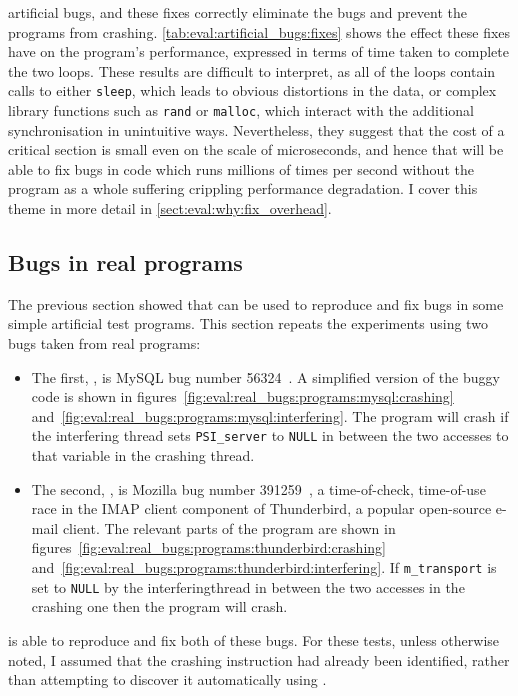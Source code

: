artificial bugs, and these fixes correctly eliminate the bugs and
prevent the programs from crashing.
\autoref{tab:eval:artificial_bugs:fixes} shows the effect these fixes
have on the program's performance, expressed in terms of time taken to
complete the two loops.  These results are difficult to interpret, as
all of the loops contain calls to either \texttt{sleep}, which leads
to obvious distortions in the data, or complex library functions such
as \texttt{rand} or \texttt{malloc}, which interact with the
additional synchronisation in unintuitive ways.  Nevertheless, they
suggest that the cost of a {\technique} critical section is small even
on the scale of microseconds, and hence that {\technique} will be able
to fix bugs in code which runs millions of times per second without
the program as a whole suffering crippling performance degradation.  I
cover this theme in more detail in
\autoref{sect:eval:why:fix_overhead}.

\subsection{Bugs in real programs}
\label{sect:eval:does:real}

The previous section showed that {\technique} can be used to reproduce
and fix bugs in some simple artificial test programs.  This section
repeats the experiments using two bugs taken from real programs:
\begin{itemize}
\item The first, , is MySQL bug number
  56324~\cite{FFFCorreia2010}.  A simplified version of the buggy code
  is shown in figures~\ref{fig:eval:real_bugs:programs:mysql:crashing}
  and~\ref{fig:eval:real_bugs:programs:mysql:interfering}.  The
  program will crash if the interfering thread sets
  \texttt{PSI\_server} to \texttt{NULL} in between the two accesses to
  that variable in the crashing thread.
\item The second, , is Mozilla bug number
  391259~\cite{FFFMery2007}, a time-of-check, time-of-use race in the
  IMAP client component of Thunderbird, a popular open-source e-mail
  client.  The relevant parts of the program are shown in
  figures~\ref{fig:eval:real_bugs:programs:thunderbird:crashing}
  and~\ref{fig:eval:real_bugs:programs:thunderbird:interfering}.  If
  \verb|m_transport| is set to \verb|NULL| by the
  \gls{interferingthread} in between the two accesses in the crashing
  one then the program will crash.
\end{itemize}
{\Technique} is able to reproduce and fix both of these bugs.  For
these tests, unless otherwise noted, I assumed that the crashing
instruction had already been identified, rather than attempting to
discover it automatically using {\technique}.

